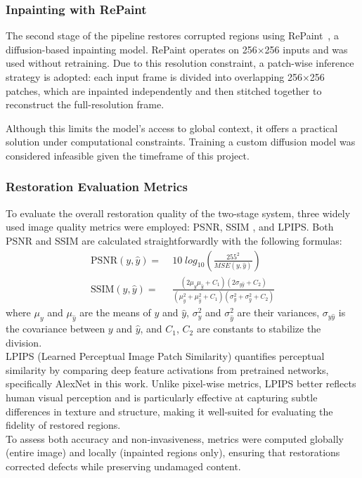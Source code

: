\documentclass[10pt,a4paper,twocolumn,twoside]{article}
\begin{document}
\subsubsection{Inpainting with RePaint}

The second stage of the pipeline restores corrupted regions using RePaint~\cite{repaint}, a diffusion-based inpainting model. RePaint operates on 256$\times$256 inputs and was used without retraining. Due to this resolution constraint, a patch-wise inference strategy is adopted: each input frame is divided into overlapping 256$\times$256 patches, which are inpainted independently and then stitched together to reconstruct the full-resolution frame.

Although this limits the model’s access to global context, it offers a practical solution under computational constraints. Training a custom diffusion model was considered infeasible given the timeframe of this project.
\subsubsection{Restoration Evaluation Metrics}
\label{experimental_setup_metrics}
To evaluate the overall restoration quality of the two-stage system, three widely used image quality metrics were employed: PSNR, SSIM \cite{psnrssim}, and LPIPS.
Both PSNR and SSIM are calculated straightforwardly with the following formulas:
\begin{align*}
    \text{PSNR}(y,\hat{y}) =& \;10\;log_{10} \left( \frac{255^2}{MSE(y,\hat{y})}\right)\\
   \text{SSIM}(y, \hat{y}) =& \;\frac{(2\mu_y\mu_{\hat{y}} + C_1)(2\sigma_{y\hat{y}} + C_2)}{(\mu_y^2 + \mu_{\hat{y}}^2 + C_1)(\sigma_y^2 + \sigma_{\hat{y}}^2 + C_2)}
\end{align*}
where $\mu_y$ and $\mu_{\hat{y}}$ are the means of $y$ and $\hat{y}$, $\sigma_y^2$ and $\sigma_{\hat{y}}^2$ are their variances, $\sigma_{y\hat{y}}$ is the covariance between $y$ and $\hat{y}$, and $C_1$, $C_2$ are constants to stabilize the division. \\
LPIPS (Learned Perceptual Image Patch Similarity)\cite{lpips} quantifies perceptual similarity by comparing deep feature activations from pretrained networks, specifically AlexNet\cite{alexnet} in this work. Unlike pixel-wise metrics, LPIPS better reflects human visual perception and is particularly effective at capturing subtle differences in texture and structure, making it well-suited for evaluating the fidelity of restored regions. \\ To assess both accuracy and non-invasiveness, metrics were computed globally (entire image) and locally (inpainted regions only), ensuring that restorations corrected defects while preserving undamaged content.
\end{document}
